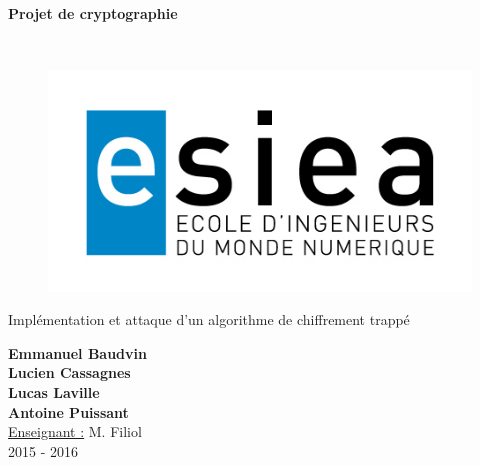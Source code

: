 \begin{titlepage}
      \begin{center}   
        \Huge
        \textbf{Projet de cryptographie}
        
        \LARGE
        ~
        
        
        \vfill
        \begin{figure}[H]
	    \centering
	    \begin{minipage}{0.9\textwidth}
		\centering
		\includegraphics[width=\textwidth]{./img/esiea.jpeg}
	    \end{minipage}\hfill
	\end{figure}
        \vfill
        
        \vspace{0.5cm}
        
        Implémentation et attaque d'un algorithme de chiffrement trappé
        
        \vspace{2cm}
        \textbf{Emmanuel Baudvin}\\\textbf{Lucien Cassagnes}\\\textbf{Lucas Laville}\\\textbf{Antoine Puissant}\\
        \vspace{0.8cm}
        \Large
        \underline{Enseignant :} M. Filiol\\
        \vspace{0.5cm}
        2015 - 2016%
        
    \end{center}
\end{titlepage}